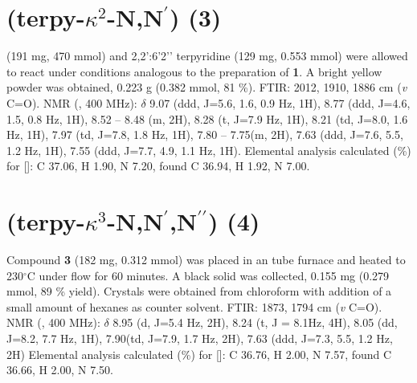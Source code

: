 \section{(terpy-$\kappa^2$-N,N$^\prime$) (3)} \label{sec.c3}
 (191 mg, 470 mmol) and 2,2’:6’2’’ terpyridine (129 mg, 0.553 mmol) were allowed to react under conditions analogous to the preparation of \textbf{1}. A bright yellow powder was obtained, 0.223 g (0.382 mmol, 81 \%). FTIR: 2012, 1910, 1886 cm (\textit{v} C=O).  NMR (, 400 MHz): $\delta$ 9.07 (ddd, J=5.6, 1.6, 0.9 Hz, 1H), 8.77 (ddd, J=4.6, 1.5, 0.8 Hz, 1H), 8.52 – 8.48 (m, 2H), 8.28 (t, J=7.9 Hz, 1H), 8.21 (td, J=8.0, 1.6 Hz, 1H), 7.97 (td, J=7.8, 1.8 Hz, 1H), 7.80 – 7.75(m, 2H), 7.63 (ddd, J=7.6, 5.5, 1.2 Hz, 1H), 7.55 (ddd, J=7.7, 4.9, 1.1 Hz, 1H). Elemental analysis calculated (\%) for []: C 37.06, H 1.90, N 7.20, found C 36.94, H 1.92, N 7.00.  

\section{(terpy-$\kappa^3$-N,N$^\prime$,N$^{\prime \prime}$) (4)} \label{sec.c4}
Compound \textbf{3} (182 mg, 0.312 mmol) was placed in an tube furnace and heated to 230$^\circ$C under  flow for 60 minutes. A black solid was collected, 0.155 mg (0.279 mmol, 89 \% yield). Crystals were obtained from chloroform with addition of a small amount of hexanes as counter solvent. FTIR: 1873, 1794 cm (\textit{v} C=O).  NMR (, 400 MHz): $\delta$ 8.95 (d, J=5.4 Hz, 2H), 8.24 (t, J = 8.1Hz, 4H), 8.05 (dd, J=8.2, 7.7 Hz, 1H), 7.90(td, J=7.9, 1.7 Hz, 2H), 7.63 (ddd, J=7.3, 5.5, 1.2 Hz, 2H) Elemental analysis calculated (\%) for []: C 36.76, H 2.00, N 7.57, found C 36.66, H 2.00, N 7.50.



